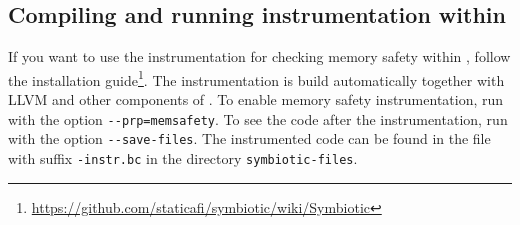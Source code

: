 \subsection{Compiling and running instrumentation within \symbiotic}

If you want to use the instrumentation for checking memory safety within
\symbiotic, follow the \symbiotic installation
guide\footnote{\url{https://github.com/staticafi/symbiotic/wiki/Symbiotic}}.
The instrumentation is build automatically together with LLVM and other
components of \symbiotic. To enable memory safety instrumentation, run
\symbiotic with the option \texttt{-{}-prp=memsafety}. To see the code after
the instrumentation, run \symbiotic with the option \texttt{-{}-save-files}.
The instrumented code can be found in the file with suffix \texttt{-instr.bc}
in the directory \texttt{symbiotic-files}.

